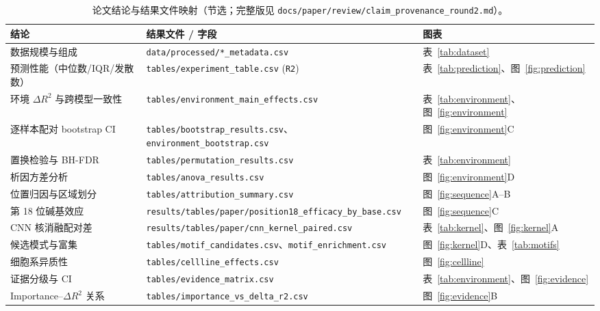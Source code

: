 \begin{table}[htbp]
\centering
\small
\caption{论文结论与结果文件映射（节选；完整版见 \texttt{docs/paper/review/claim\_provenance\_round2.md}）。}
\label{tab:claimmap}
\begin{tabular}{p{5.4cm}p{6.6cm}p{2.6cm}}
\toprule
结论 & 结果文件 / 字段 & 图表 \\
\midrule
数据规模与组成 & \texttt{data/processed/*\_metadata.csv} & 表~\ref{tab:dataset} \\
预测性能（中位数/IQR/发散数） & \texttt{tables/experiment\_table.csv} (\texttt{R2}) & 表~\ref{tab:prediction}、图~\ref{fig:prediction} \\
环境 $\Delta R^{2}$ 与跨模型一致性 & \texttt{tables/environment\_main\_effects.csv} & 表~\ref{tab:environment}、图~\ref{fig:environment} \\
逐样本配对 bootstrap CI & \texttt{tables/bootstrap\_results.csv}、\texttt{environment\_bootstrap.csv} & 图~\ref{fig:environment}C \\
置换检验与 BH-FDR & \texttt{tables/permutation\_results.csv} & 表~\ref{tab:environment} \\
析因方差分析 & \texttt{tables/anova\_results.csv} & 图~\ref{fig:environment}D \\
位置归因与区域划分 & \texttt{tables/attribution\_summary.csv} & 图~\ref{fig:sequence}A--B \\
第 18 位碱基效应 & \texttt{results/tables/paper/position18\_efficacy\_by\_base.csv} & 图~\ref{fig:sequence}C \\
CNN 核消融配对差 & \texttt{results/tables/paper/cnn\_kernel\_paired.csv} & 表~\ref{tab:kernel}、图~\ref{fig:kernel}A \\
候选模式与富集 & \texttt{tables/motif\_candidates.csv}、\texttt{motif\_enrichment.csv} & 图~\ref{fig:kernel}D、表~\ref{tab:motifs} \\
细胞系异质性 & \texttt{tables/cellline\_effects.csv} & 图~\ref{fig:cellline} \\
证据分级与 CI & \texttt{tables/evidence\_matrix.csv} & 表~\ref{tab:environment}、图~\ref{fig:evidence} \\
Importance--$\Delta R^{2}$ 关系 & \texttt{tables/importance\_vs\_delta\_r2.csv} & 图~\ref{fig:evidence}B \\
\bottomrule
\end{tabular}
\end{table}
